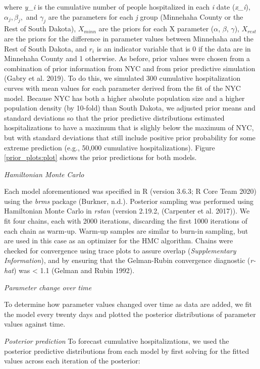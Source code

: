\documentclass[
]{article}
\begin{document}
where \emph{y\_i} is the cumulative number of people hospitalized in each \emph{i} date (\emph{x\_i}), \(\alpha_j, \beta_j,\) and \(\gamma_j\) are the parameters for each \emph{j} group (Minnehaha County or the Rest of South Dakota), \(X_{minn}\) are the priors for each X parameter (\(\alpha\), \(\beta\), \(\gamma\)), \(X_{rest}\) are the priors for the difference in parameter values between Minnehaha and the Rest of South Dakota, and \(r_i\) is an indicator variable that is 0 if the data are in Minnehaha County and 1 otherwise.
As before, prior values were chosen from a combination of prior information from NYC and from prior predictive simulation (Gabry et al. 2019). To do this, we simulated 300 cumulative hospitalization curves with mean values for each parameter derived from the fit of the NYC model. Because NYC has both a higher absolute population size and a higher population density (by 10-fold) than South Dakota, we adjusted prior means and standard deviations so that the prior predictive distributions estimated hospitalizations to have a maximum that is slighly below the maximum of NYC, but with standard deviations that still include positive prior probability for some extreme prediction (e.g., 50,000 cumulative hospitalizations). Figure \ref{prior_plots:plot} shows the prior predictions for both models.

\emph{Hamiltonian Monte Carlo}

Each model aforementioned was specified in R (version 3.6.3; R Core Team 2020) using the \emph{brms} package (Burkner, n.d.). Posterior sampling was performed using Hamiltonian Monte Carlo in \emph{rstan} (version 2.19.2, (Carpenter et al. 2017)). We fit four chains, each with 2000 iterations, discarding the first 1000 iterations of each chain as warm-up. Warm-up samples are similar to burn-in sampling, but are used in this case as an optimizer for the HMC algorithm. Chains were checked for convergence using trace plots to assure overlap (\emph{Supplementary Information}), and by ensuring that the Gelman-Rubin convergence diagnostic (\emph{r-hat}) was \textless{} 1.1 (Gelman and Rubin 1992).

\emph{Parameter change over time}

To determine how parameter values changed over time as data are added, we fit the model every twenty days and plotted the posterior distributions of parameter values against time.

\emph{Posterior prediction}
To forecast cumulative hospitalizations, we used the posterior predictive distributions from each model by first solving for the fitted values across each iteration of the posterior:
\end{document}
